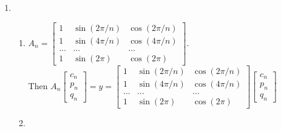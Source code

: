 \documentclass{article}
\begin{document}
\begin{enumerate}
    \item
    
    \begin{enumerate}
        \item 
        
        $A_n = 
        \begin{bmatrix}
        1 & \sin(2\pi/n) & \cos(2\pi/n)\\
        1 & \sin(4\pi/n) & \cos(4\pi/n)\\
        \hdots & \hdots & \hdots\\
        1 & \sin(2\pi) & \cos(2\pi)
        \end{bmatrix}.$\\
        Then $A_n\begin{bmatrix}
        c_n\\
        p_n\\
        q_n
        \end{bmatrix} = y = \begin{bmatrix}
        1 & \sin(2\pi/n) & \cos(2\pi/n)\\
        1 & \sin(4\pi/n) & \cos(4\pi/n)\\
        \hdots & \hdots & \hdots\\
        1 & \sin(2\pi) & \cos(2\pi)
        \end{bmatrix}\begin{bmatrix}
        c_n\\
        p_n\\
        q_n
        \end{bmatrix}$
        
        \item
        

\end{enumerate}
\end{enumerate}
\end{document}
